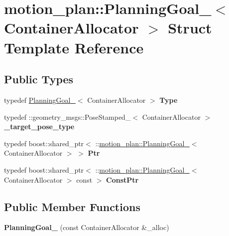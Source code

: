 \hypertarget{structmotion__plan_1_1PlanningGoal__}{}\section{motion\+\_\+plan\+:\+:Planning\+Goal\+\_\+$<$ Container\+Allocator $>$ Struct Template Reference}
\label{structmotion__plan_1_1PlanningGoal__}
\subsection*{Public Types}
\begin{DoxyCompactItemize}
\item 
\mbox{\label{structmotion__plan_1_1PlanningGoal___a9103e1fa067b4bfa01a8712ea2b1394f}} 
typedef \hyperlink{structmotion__plan_1_1PlanningGoal__}{Planning\+Goal\+\_\+}$<$ Container\+Allocator $>$ {\bfseries Type}
\item 
\mbox{\label{structmotion__plan_1_1PlanningGoal___a331b43ab3591904f9e7e9e53939ad7b2}} 
typedef \+::geometry\+\_\+msgs\+::\+Pose\+Stamped\+\_\+$<$ Container\+Allocator $>$ {\bfseries \+\_\+target\+\_\+pose\+\_\+type}
\item 
\mbox{\label{structmotion__plan_1_1PlanningGoal___ab35b1a287eba13bcb665c891ad9120e9}} 
typedef boost\+::shared\+\_\+ptr$<$ \+::\hyperlink{structmotion__plan_1_1PlanningGoal__}{motion\+\_\+plan\+::\+Planning\+Goal\+\_\+}$<$ Container\+Allocator $>$ $>$ {\bfseries Ptr}
\item 
\mbox{\label{structmotion__plan_1_1PlanningGoal___a770557e2c8aa2edd2b02078f314585dd}} 
typedef boost\+::shared\+\_\+ptr$<$ \+::\hyperlink{structmotion__plan_1_1PlanningGoal__}{motion\+\_\+plan\+::\+Planning\+Goal\+\_\+}$<$ Container\+Allocator $>$ const  $>$ {\bfseries Const\+Ptr}
\end{DoxyCompactItemize}
\subsection*{Public Member Functions}
\begin{DoxyCompactItemize}
\item 
\mbox{\label{structmotion__plan_1_1PlanningGoal___a28bff98017ecdf4f7714a76386128c61}} 
{\bfseries Planning\+Goal\+\_\+} (const Container\+Allocator \&\+\_\+alloc)
\end{DoxyCompactItemize}
